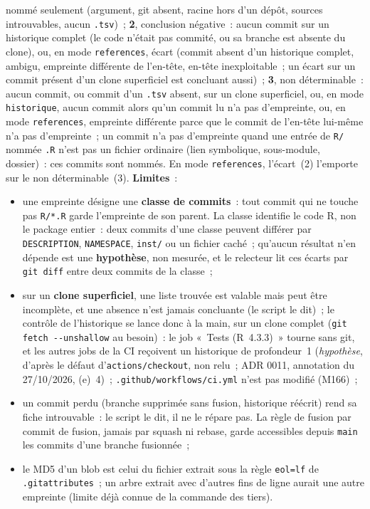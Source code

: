 \documentclass[a4paper,11pt]{article}
\newcommand{\code}[1]{\texttt{\small #1}}
\begin{document}
nommé seulement (argument, git absent, racine hors d'un dépôt, sources
introuvables, aucun \code{.tsv})~; \textbf{2}, conclusion négative~: aucun
commit sur un historique complet (le code n'était pas commité, ou sa
branche est absente du clone), ou, en mode \code{references}, écart
(commit absent d'un historique complet, ambigu, empreinte différente de
l'en-tête, en-tête inexploitable~; un écart sur un commit présent d'un
clone superficiel est concluant aussi)~; \textbf{3}, non déterminable~:
aucun commit, ou commit d'un \code{.tsv} absent, sur un clone
superficiel, ou, en mode \code{historique}, aucun commit alors qu'un
commit lu n'a pas d'empreinte, ou, en mode \code{references}, empreinte
différente parce que le commit de l'en-tête lui-même n'a pas
d'empreinte~; un commit n'a pas d'empreinte quand une entrée de
\code{R/} nommée \code{*.R} n'est pas un fichier ordinaire (lien
symbolique, sous-module, dossier)~: ces commits sont nommés. En mode
\code{references}, l'écart~(2) l'emporte sur le non déterminable~(3).
\textbf{Limites}~:
\begin{itemize}[leftmargin=*, itemsep=2pt]
  \item une empreinte désigne une \textbf{classe de commits}~: tout commit
    qui ne touche pas \code{R/*.R} garde l'empreinte de son parent. La
    classe identifie le code R, non le package entier~: deux commits d'une
    classe peuvent différer par \code{DESCRIPTION}, \code{NAMESPACE},
    \code{inst/} ou un fichier caché~; qu'aucun résultat n'en dépende est
    une \textbf{hypothèse}, non mesurée, et le relecteur lit ces écarts par
    \code{git diff} entre deux commits de la classe~;
  \item sur un \textbf{clone superficiel}, une liste trouvée est valable
    mais peut être incomplète, et une absence n'est jamais concluante (le
    script le dit)~; le contrôle de l'historique se lance donc à la main,
    sur un clone complet (\code{git fetch -{}-unshallow} au besoin)~: le
    job «~Tests (R~4.3.3)~» tourne sans git, et les autres jobs de la CI
    reçoivent un historique de profondeur~1 (\emph{hypothèse}, d'après le
    défaut d'\code{actions/checkout}, non relu~; ADR 0011, annotation du
    27/10/2026, (e)~4)~; \code{.github/workflows/ci.yml} n'est pas modifié
    (M166)~;
  \item un commit perdu (branche supprimée sans fusion, historique réécrit)
    rend sa fiche introuvable~: le script le dit, il ne le répare pas. La
    règle de fusion par commit de fusion, jamais par squash ni rebase,
    garde accessibles depuis \code{main} les commits d'une branche
    fusionnée~;
  \item le MD5 d'un blob est celui du fichier extrait sous la règle
    \code{eol=lf} de \code{.gitattributes}~; un arbre extrait avec d'autres
    fins de ligne aurait une autre empreinte (limite déjà connue de la
    commande des tiers).
\end{itemize}
\end{document}

